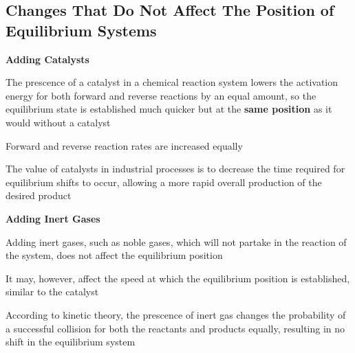 \subsection{Changes That Do Not Affect The Position of Equilibrium Systems}
\begin{bulleted-list}
    \item \textbf{Adding Catalysts}
        \begin{bulleted-list}
            \item The prescence of a catalyst in a chemical reaction system lowers the activation
                energy for both forward and reverse reactions by an equal amount, so the equilibrium
                state is established much quicker but at the \textbf{same position} as it would without
                a catalyst
            \item Forward and reverse reaction rates are increased equally
            \item The value of catalysts in industrial processes is to decrease the time required
                for equilibrium shifts to occur, allowing a more rapid overall production of the
                desired product
        \end{bulleted-list}
    \item \textbf{Adding Inert Gases}
        \begin{bulleted-list}
            \item Adding inert gases, such as noble gases, which will not partake in the reaction
                of the system, does not affect the equilibrium position
            \item It may, however, affect the speed at which the equilibrium position is established,
                similar to the catalyst
            \item According to kinetic theory, the prescence of inert gas changes the probability
                of a successful collision for both the reactants and products equally,
                resulting in no shift in the equilibrium system
        \end{bulleted-list}
\end{bulleted-list}


